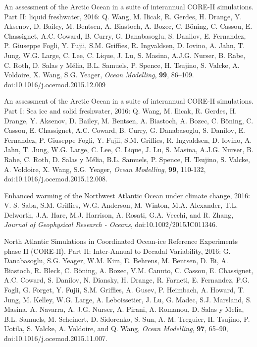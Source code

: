 \begin{etaremune}
\item An assessment of the Arctic Ocean in a suite of interannual  CORE-II simulations. Part II: liquid freshwater, 2016: Q. Wang,  M. Ilicak, R. Gerdes, H. Drange, Y. Aksenov, D. Bailey, M. Bentsen,  A. Biastoch, A. Bozec, C. B\"{o}ning, C.  Cassou, E. Chassignet,
  A.C. Coward, B. Curry, G. Danabasoglu, S. Danilov, E. Fernandez,  P. Giuseppe Fogli, Y. Fujii, S.M. Grif\/f\/ies, R. Ingvaldsen,  D. Iovino, A. Jahn, T. Jung, W.G. Large, C. Lee, C. Lique, J. Lu,
  S. Masina, A.J.G. Nurser, B. Rabe, C. Roth, D. Salas y M\'elia,  B.L. Samuels, P. Spence, H. Tsujino, S. Valcke, A. Voldoire,  X. Wang, S.G. Yeager, {\it Ocean Modelling}, {\bf 99}, 86--109.  doi:10.1016/j.ocemod.2015.12.009

\item An assessment of the Arctic Ocean in a suite of interannual  CORE-II simulations. Part I: Sea ice and solid freshwater, 2016:  Q. Wang, M. Ilicak, R. Gerdes, H. Drange, Y. Aksenov, D. Bailey,  M. Bentsen, A. Biastoch, A. Bozec, C. B\"{o}ning, C.  Cassou,
  E. Chassignet, A.C. Coward, B. Curry, G. Danabasoglu, S. Danilov,  E. Fernandez, P. Giuseppe Fogli, Y. Fujii, S.M. Grif\/f\/ies,  R. Ingvaldsen, D. Iovino, A. Jahn, T. Jung, W.G. Large, C. Lee,  C. Lique, J. Lu, S. Masina, A.J.G. Nurser, B. Rabe, C. Roth,
  D. Salas y M\'elia, B.L. Samuels, P. Spence, H. Tsujino, S. Valcke,  A. Voldoire, X. Wang, S.G. Yeager, {\it Ocean Modelling}, {\bf 99}, 110-132, doi:10.1016/j.ocemod.2015.12.008.

\item Enhanced warming of the Northwest Atlantic Ocean under climate  change, 2016: V. S. Saba, S.M. Grif\/f\/ies, W.G. Anderson,  M. Winton, M.A. Alexander, T.L. Delworth, J.A. Hare, M.J. Harrison, A. Rosati, G.A. Vecchi, and R. Zhang, {\it Journal of Geophysical Research - Oceans}, doi:10.1002/2015JC011346.

\item North Atlantic Simulations in Coordinated Ocean-ice Reference  Experiments phase II (CORE-II). Part II: Inter-Annual to Decadal  Variability, 2016: G. Danabasoglu, S.G. Yeager, W.M. Kim,  E. Behrens, M. Bentsen, D. Bi, A. Biastoch, R. Bleck, C. B\"{o}ning,  A. Bozec, V.M. Canuto, C. Cassou, E. Chassignet, A.C. Coward, S. Danilov, N. Diansky, H. Drange, R. Farneti, E. Fernandez, P.G. Fogli, G. Forget, Y. Fujii, S.M. Grif\/f\/ies, A. Gusev, P. Heimbach, A. Howard, T. Jung, M. Kelley, W.G. Large,  A. Leboissetier, J. Lu, G. Madec, S.J. Marsland, S. Masina,  A. Navarra, A. J.G. Nurser, A. Pirani, A. Romanou, D. Salas y Melia, B.L. Samuels, M. Scheinert, D. Sidorenko, S. Sun, A.-M. Treguier, H. Tsujino, P. Uotila, S. Valcke, A. Voldoire, and Q. Wang, {\it Ocean Modelling}, {\bf 97}, 65--90, 
doi:10.1016/j.ocemod.2015.11.007.


\end{etaremune}
